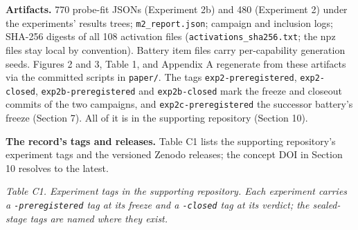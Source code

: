 \textbf{Artifacts.} 770 probe-fit JSONs (Experiment 2b) and 480
(Experiment 2) under the experiments' results trees; \texttt{m2\_report.json};
campaign and inclusion logs; SHA-256 digests of all 108 activation
files (\texttt{activations\_sha256.txt}; the npz files stay local by
convention). Battery item files carry per-capability generation seeds.
Figures 2 and 3, Table 1, and Appendix A regenerate from these
artifacts via the committed scripts in \texttt{paper/}. The tags \texttt{exp2-preregistered}, \texttt{exp2-closed},
\texttt{exp2b-preregistered} and \texttt{exp2b-closed} mark the freeze and closeout
commits of the two campaigns, and \texttt{exp2c-preregistered} the successor
battery's freeze (Section 7). All of it is in the supporting
repository (Section 10).

\textbf{The record's tags and releases.} Table C1 lists the supporting
repository's experiment tags and the versioned Zenodo releases; the
concept DOI in Section 10 resolves to the latest.

\emph{Table C1. Experiment tags in the supporting repository. Each
experiment carries a \texttt{-preregistered} tag at its freeze and a
\texttt{-closed} tag at its verdict; the sealed-stage tags are named where
they exist.}

